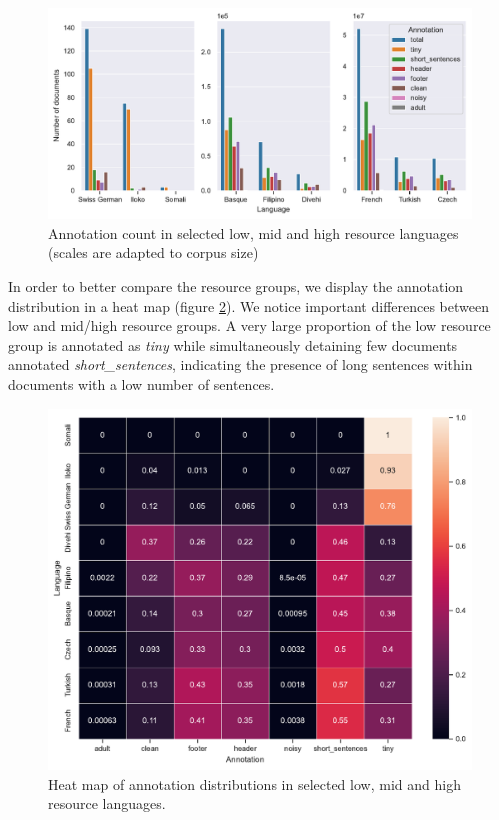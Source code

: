\begin{figure}[!ht]
    \begin{center}
        \includegraphics[scale=0.7]{static/media/data/towards/annot_count.pdf}
        \caption{Annotation count in selected low, mid and high resource languages (scales are adapted to corpus size)}
        \label{annot-count}
    \end{center}
\end{figure}

In order to better compare the resource groups, we display the annotation distribution in a heat map (figure \ref{annot-heatmap}).
We notice important differences between low and mid/high resource groups.
A very large proportion of the low resource group is annotated as \textit{tiny} while simultaneously detaining few documents annotated \textit{short\_sentences}, indicating the presence of long sentences within documents with a low number of sentences.

\begin{figure}[!ht]
    \begin{center}
        \includegraphics[width=\linewidth]{static/media/data/towards/annot_heatmap}
        \caption{Heat map of annotation distributions in selected low, mid and high resource languages.}
        \label{annot-heatmap}
    \end{center}
\end{figure}

